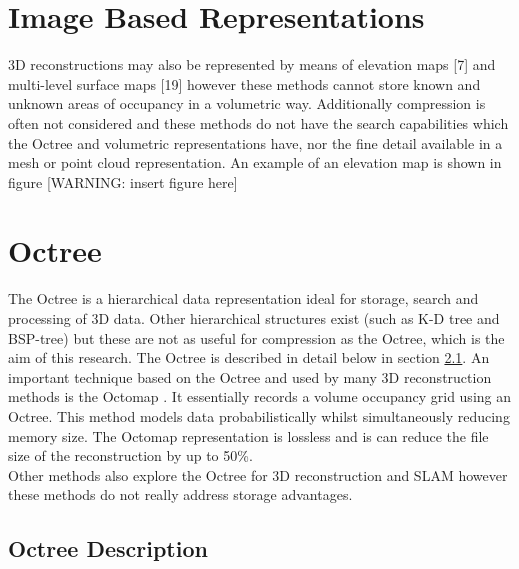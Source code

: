 \section{Image Based Representations}

3D reconstructions may also be represented by means of elevation maps [7] and multi-level surface maps [19] however these methods cannot store known and unknown areas of occupancy in a volumetric way. Additionally compression is often not considered and these methods do not have the search capabilities which the Octree and volumetric representations have, nor the fine detail available in a mesh or point cloud representation. An example of an elevation map is shown in figure [WARNING: insert figure here]


\section{Octree}

The Octree is a hierarchical data representation ideal for storage, search and processing of 3D data. Other hierarchical structures exist (such as K-D tree and BSP-tree) \cite{Samet06Foundations} but these are not as useful for compression as the Octree, which is the aim of this research. The Octree is described in detail below in section \ref{OTDesc}. An important technique based on the Octree and used by many 3D reconstruction methods is the Octomap \cite{Wurm10Octomap}. It essentially records a volume occupancy grid using an Octree. This method models data probabilistically whilst simultaneously reducing memory size. The Octomap representation is lossless and is can reduce the file size of the reconstruction by up to 50\%. \\

Other methods also explore the Octree for 3D reconstruction and SLAM \cite{9,Fournier07Mapping,Meagher82Geometric,Fairfield07Real} however these methods do not really address storage advantages. 



\subsection{Octree Description}
\label{OTDesc}

